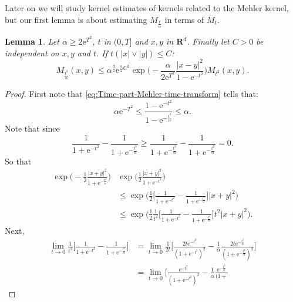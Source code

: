 \documentclass[a4paper,oneside,10pt]{amsproc}
\theoremstyle{plain}
\newtheorem{lemma}{Lemma}
\theoremstyle{remark}
\theoremstyle{definition}
\renewcommand{\leq}{\leqslant}
\renewcommand{\leq}{\leqslant}
\renewcommand{\geq}{\geqslant}
\newcommand{\R}{\mathbf R}
\newcommand{\e}{\mathrm{e}} %
\renewcommand{\leq}{\leqslant} %
\renewcommand{\geq}{\geqslant} %
\begin{document}
Later on we will study kernel estimates of kernels related to the
Mehler kernel, but our first lemma is about estimating
$M_{\frac{t}\alpha}$ in terms of $M_t$.
\begin{lemma}\label{lem:Kernel-estimates-1}
 Let $\alpha \geq 2 \e^{T^2}$, $t$ in $(0, T]$ and $x, y$ in $\R^d$.
 Finally let $C > 0$ be independent on $x, y$ and $t$. If $t
 (|x| \vee |y|) \leq C$:
  \begin{equation}
    \label{eq:Kernel-lemma-1-estimate} 
    M_{\frac{t^2}{\alpha}}(x, y) \leq \alpha^{\frac{d}2} \e^{\frac\alpha2 C^2} \exp\biggl (-\frac{\alpha}{2 \e^{T^2}} \frac{|x - y|^2}{1 - \e^{-t^2}} \biggr ) M_{t^2}(x, y).
  \end{equation}
\end{lemma}
\begin{proof}
  First note that \eqref{eq:Time-part-Mehler-time-transform} tells
  that:
  \begin{equation*}
    \alpha \e^{-T^2} \leq \frac{1 - \e^{-t^2}}{1 -
      \e^{-\frac{t^2}{\alpha}}} \leq \alpha.
  \end{equation*}
  Note that since
  \begin{equation*}
    \frac{1}{1 + \e^{-t^2}} - \frac{1}{1 + \e^{-\frac{t^2}{\alpha}}}
    \geq \frac{1}{1 + \e^{-\frac{t^2}{\alpha}}} - \frac{1}{1 +
      \e^{-\frac{t^2}{\alpha}}} = 0.
  \end{equation*}
  So that
  \begin{align*}
    \exp \biggl (-\frac12 \frac{|x + y|^2}{1 + \e^{-\frac{t^2}{\alpha}}}
    \biggr ) &\exp \biggl (\frac12 \frac{|x + y|^2}{1 + \e^{-t^2}}
    \biggr )\\
    &\leq \exp \biggl (\frac12 \biggl[\frac{1}{1 +
      \e^{-t^2}} - \frac{1}{1 + \e^{-\frac{t^2}{\alpha}}}
    \biggr] |x + y|^2 \biggr)\\
    &\leq \exp \biggl (\frac12 \frac1{t^2}\biggl[\frac{1}{1 +
      \e^{-t^2}} - \frac{1}{1 + \e^{-\frac{t^2}{\alpha}}}
    \biggr] t^2 |x + y|^2 \biggr).
  \end{align*}
  Next,
  \begin{align*}
    \lim_{t \to 0} \frac1{t^2}\biggl[\frac{1}{1 +
      \e^{-t^2}} - \frac{1}{1 + \e^{-\frac{t^2}{\alpha}}} \biggr] &=
    \lim_{t \to 0} \frac1{2t} \biggl[\frac{2t \e^{-t^2}}{(1 + \e^{-t^2})^2} -
    \frac1\alpha \frac{2t \e^{-\frac{t^2}{\alpha}}}{(1 +
      \e^{-\frac{t^2}{\alpha}})^2} \biggr]\\
    &= \lim_{t \to 0} \biggl[\frac{\e^{-t^2}}{(1 + \e^{-t^2})^2} -
    \frac1\alpha \frac{\e^{-\frac{t^2}{\alpha}}}{(1 +
}
\end{align*}
\end{proof}
\end{document}

